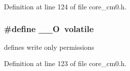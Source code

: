 Definition at line 124 of file core\+\_\+cm0.\+h.

\subsubsection[{\texorpdfstring{\+\_\+\+\_\+O}{__O}}]{\setlength{\rightskip}{0pt plus 5cm}\#define \+\_\+\+\_\+O~volatile}\hypertarget{group___c_m_s_i_s__core__definitions_ga7e25d9380f9ef903923964322e71f2f6}{}\label{group___c_m_s_i_s__core__definitions_ga7e25d9380f9ef903923964322e71f2f6}
defines \textquotesingle{}write only\textquotesingle{} permissions 

Definition at line 123 of file core\+\_\+cm0.\+h.

